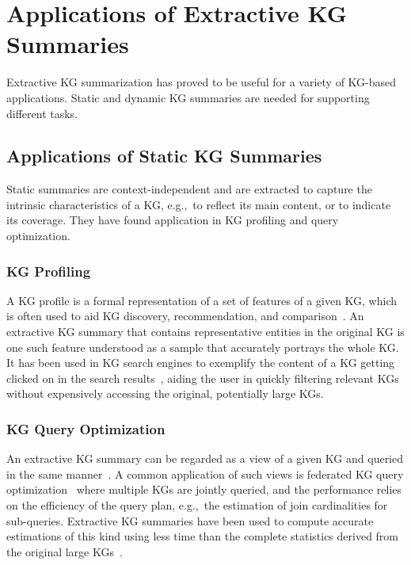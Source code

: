 \section{Applications of Extractive KG Summaries}
\label{sec:applications}

Extractive KG summarization has proved to be useful for a variety of KG-based applications. Static and dynamic KG summaries are needed for supporting different tasks.

\subsection{Applications of Static KG Summaries}

Static summaries are context-independent and are extracted to capture the intrinsic characteristics of a KG, e.g.,~to reflect its main content, or to indicate its coverage. They have found application in KG profiling and query optimization.

\subsubsection{KG Profiling}
A KG profile is a formal representation of a set of features of a given KG, which is often used to aid KG discovery, recommendation, and comparison~\cite{DBLP:journals/semweb/EllefiBBDDST18}. An extractive KG summary that contains representative entities in the original KG is one such feature understood as a sample that accurately portrays the whole KG. It has been used in KG search engines to exemplify the content of a KG getting clicked on in the search results~\cite{DBLP:journals/dint/WangLLCQ22}, aiding the user in quickly filtering relevant KGs without expensively accessing the original, potentially large KGs.

\subsubsection{KG Query Optimization}
An extractive KG summary can be regarded as a view of a given KG and queried in the same manner~\cite{DBLP:conf/icde/FanWW14,DBLP:conf/dexa/Wang17,DBLP:conf/cikm/LiCL16}. A common application of such views is federated KG query optimization~\cite{DBLP:conf/semweb/MontoyaSH17} where multiple KGs are jointly queried, and the performance relies on the efficiency of the query plan, e.g.,~the estimation of join cardinalities for sub-queries. Extractive KG summaries have been used to compute accurate estimations of this kind using less time than the complete statistics derived from the original large KGs~\cite{DBLP:journals/semweb/HelingA23}.

